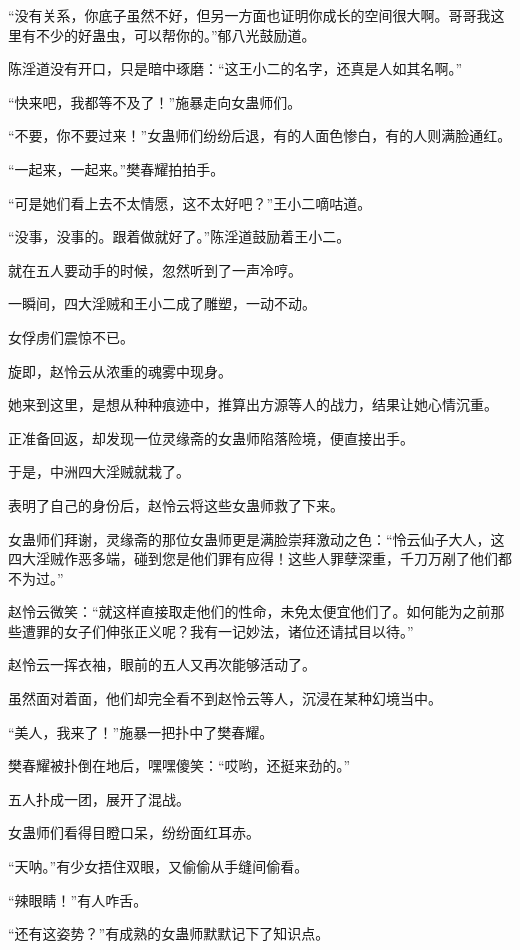 \begin{this_body}
“没有关系，你底子虽然不好，但另一方面也证明你成长的空间很大啊。哥哥我这里有不少的好蛊虫，可以帮你的。”郁八光鼓励道。

陈淫道没有开口，只是暗中琢磨：“这王小二的名字，还真是人如其名啊。”

“快来吧，我都等不及了！”施暴走向女蛊师们。

“不要，你不要过来！”女蛊师们纷纷后退，有的人面色惨白，有的人则满脸通红。

“一起来，一起来。”樊春耀拍拍手。

“可是她们看上去不太情愿，这不太好吧？”王小二嘀咕道。

“没事，没事的。跟着做就好了。”陈淫道鼓励着王小二。

就在五人要动手的时候，忽然听到了一声冷哼。

一瞬间，四大淫贼和王小二成了雕塑，一动不动。

女俘虏们震惊不已。

旋即，赵怜云从浓重的魂雾中现身。

她来到这里，是想从种种痕迹中，推算出方源等人的战力，结果让她心情沉重。

正准备回返，却发现一位灵缘斋的女蛊师陷落险境，便直接出手。

于是，中洲四大淫贼就栽了。

表明了自己的身份后，赵怜云将这些女蛊师救了下来。

女蛊师们拜谢，灵缘斋的那位女蛊师更是满脸崇拜激动之色：“怜云仙子大人，这四大淫贼作恶多端，碰到您是他们罪有应得！这些人罪孽深重，千刀万剐了他们都不为过。”

赵怜云微笑：“就这样直接取走他们的性命，未免太便宜他们了。如何能为之前那些遭罪的女子们伸张正义呢？我有一记妙法，诸位还请拭目以待。”

赵怜云一挥衣袖，眼前的五人又再次能够活动了。

虽然面对着面，他们却完全看不到赵怜云等人，沉浸在某种幻境当中。

“美人，我来了！”施暴一把扑中了樊春耀。

樊春耀被扑倒在地后，嘿嘿傻笑：“哎哟，还挺来劲的。”

五人扑成一团，展开了混战。

女蛊师们看得目瞪口呆，纷纷面红耳赤。

“天呐。”有少女捂住双眼，又偷偷从手缝间偷看。

“辣眼睛！”有人咋舌。

“还有这姿势？”有成熟的女蛊师默默记下了知识点。


\end{this_body}
